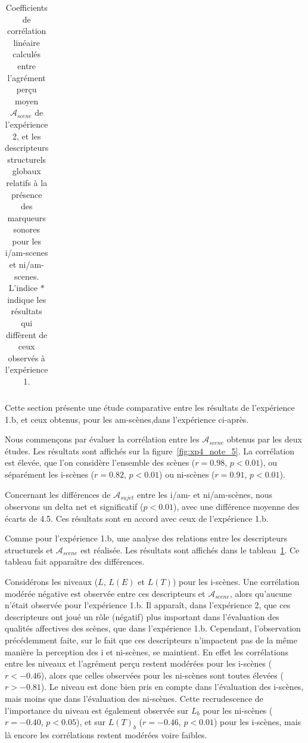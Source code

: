 \begin{table}[t]
\begin{tabular}{l r r}
\hline
\end{tabular}
\vspace{0.5mm}
\caption[Coefficients de corrélation linéaire calculés entre l'agrément perçu moyen $\mathcal{A}_{scene}$ de l'expérience 2, et les descripteurs structurels globaux relatifs à la présence des marqueurs sonores pour les i/am-scenes et ni/am-scenes.]{Coefficients de corrélation linéaire calculés entre l'agrément perçu moyen $\mathcal{A}_{scene}$ de l'expérience 2, et les descripteurs structurels globaux relatifs à la présence des marqueurs sonores pour les i/am-scenes et ni/am-scenes. L'indice $*$ indique les résultats qui diffèrent de ceux observés à l'expérience 1.}
\label{tab:corrAmXP4}
\end{table}

Cette section présente une étude comparative entre les résultats de l'expérience 1.b, et ceux obtenus, pour les am-scènes,dans l'expérience ci-après. 

Nous commençons par évaluer la corrélation entre les $\mathcal{A}_{scene}$ obtenus par les deux études. Les résultats sont affichés sur la figure~\ref{fig:xp4_note_5}. La corrélation est élevée, que l'on considère l'ensemble des scènes ($r=0.98$, $p<0.01$), ou séparément les i-scènes ($r=0.82$, $p<0.01$) ou ni-scènes ($r=0.91$, $p<0.01$).

Concernant les différences de $\mathcal{A}_{sujet}$ entre les i/am- et ni/am-scènes, nous observons un delta net et significatif ($p<0.01$), avec une différence moyenne des écarts de 4.5. Ces résultats sont en accord avec ceux de l'expérience 1.b.

Comme pour l'expérience 1.b, une analyse des relations entre les descripteurs structurels et $\mathcal{A}_{scene}$ est réalisée. Les résultats sont affichés dans le tableau~\ref{tab:corrAmXP4}. Ce tableau fait apparaître des différences. 

Considérons les niveaux ($L$, $L(E)$ et $L(T)$) pour les i-scènes. Une corrélation modérée négative est observée entre ces descripteurs et $\mathcal{A}_{scene}$, alors qu'aucune n'était observée pour l'expérience 1.b. Il apparaît, dans l'expérience 2, que ces descripteurs ont joué un rôle (négatif) plus important dans l'évaluation des qualités affectives des scènes, que dans l'expérience 1.b. Cependant, l'observation précédemment faite, sur le fait que ces descripteurs n'impactent pas de la même manière la perception des i et ni-scènes, se maintient. En effet les corrélations entre les niveaux et l'agrément perçu restent modérées pour les i-scènes ($r<-0.46$), alors que celles observées pour les ni-scènes sont toutes élevées ($r>-0.81$). Le niveau est donc bien pris en compte dans l'évaluation des i-scènes, mais moins que dans l'évaluation des ni-scènes. Cette recrudescence de l'importance du niveau est également observée sur $L_b$ pour les ni-scènes ($r=-0.40$, $p<0.05$), et sur $L(T)_b$ ($r=-0.46$, $p<0.01$) pour les i-scènes, mais là encore les corrélations restent modérées voire faibles.

